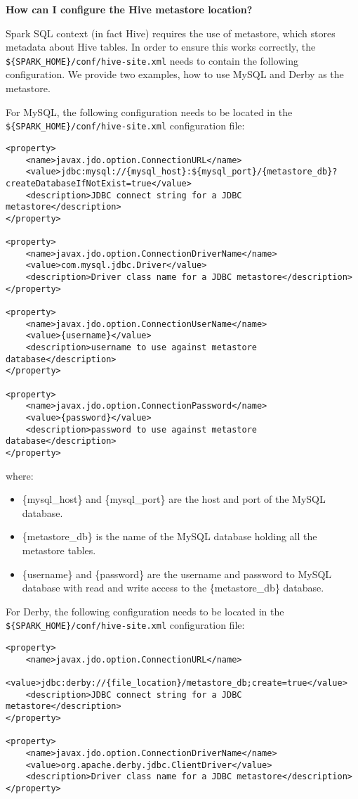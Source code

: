 \textbf{How can I configure the Hive metastore location?}

Spark SQL context (in fact Hive) requires the use of metastore, which stores metadata about Hive tables. In order to
ensure this works correctly, the {\lstinline[style=Bash]|${SPARK_HOME}/conf/hive-site.xml|} needs to contain the following
configuration. We provide two examples, how to use MySQL and Derby as the metastore.

For MySQL, the following configuration needs to be located in the {\lstinline[style=Bash]|${SPARK_HOME}/conf/hive-site.xml|} configuration file:

\begin{lstlisting}[style=Bash]
<property>
    <name>javax.jdo.option.ConnectionURL</name>
    <value>jdbc:mysql://{mysql_host}:${mysql_port}/{metastore_db}?createDatabaseIfNotExist=true</value>
    <description>JDBC connect string for a JDBC metastore</description>
</property>

<property>
    <name>javax.jdo.option.ConnectionDriverName</name>
    <value>com.mysql.jdbc.Driver</value>
    <description>Driver class name for a JDBC metastore</description>
</property>

<property>
    <name>javax.jdo.option.ConnectionUserName</name>
    <value>{username}</value>
    <description>username to use against metastore database</description>
</property>

<property>
    <name>javax.jdo.option.ConnectionPassword</name>
    <value>{password}</value>
    <description>password to use against metastore database</description>
</property>
\end{lstlisting}

where:
\begin{itemize}
\item \{mysql\_host\} and \{mysql\_port\} are the host and port of the MySQL database.
\item \{metastore\_db\} is the name of the MySQL database holding all the metastore tables.
\item \{username\} and \{password\} are the username and password to MySQL database with read and write access to the \{metastore\_db\} database.
\end{itemize}

For Derby, the following configuration needs to be located in the {\lstinline[style=Bash]|${SPARK_HOME}/conf/hive-site.xml|} configuration file:

\begin{lstlisting}[style=Bash]
<property>
    <name>javax.jdo.option.ConnectionURL</name>
    <value>jdbc:derby://{file_location}/metastore_db;create=true</value>
    <description>JDBC connect string for a JDBC metastore</description>
</property>

<property>
    <name>javax.jdo.option.ConnectionDriverName</name>
    <value>org.apache.derby.jdbc.ClientDriver</value>
    <description>Driver class name for a JDBC metastore</description>
</property>
\end{lstlisting}


